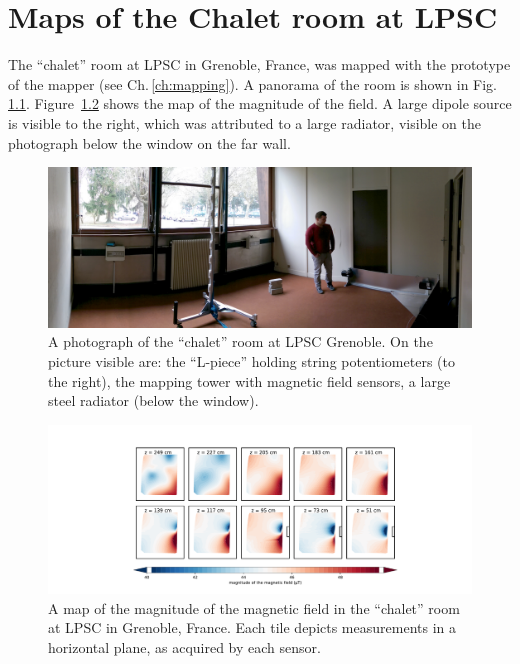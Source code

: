\chapter{Maps of the Chalet room at LPSC}
\label{ch:chalet_appendix}
The ``chalet'' room at LPSC in Grenoble, France, was mapped with the prototype of the mapper (see Ch.\,\ref{ch:mapping}). A panorama of the room is shown in Fig.\,\ref{fig:mapping_lpsc_chalet}. Figure~\ref{fig:mapping_lpsc_chalet_magnitude_map} shows the map of the magnitude of the field. A large dipole source is visible to the right, which was attributed to a large radiator, visible on the photograph below the window on the far wall.

\begin{figure}[h!]
  \centering
  \includegraphics[width=\linewidth]{gfx/mapping/lpsc/chalet_panorama.jpg}
  \caption{A photograph of the ``chalet'' room at LPSC Grenoble. On the picture visible are: the ``L-piece'' holding string potentiometers (to the right), the mapping tower with magnetic field sensors, a large steel radiator (below the window).}\label{fig:mapping_lpsc_chalet}
\end{figure}

\begin{figure}[h!]
  \centering
  \includegraphics[width=\linewidth]{gfx/mapping/lpsc/chalet.pdf}
  \caption{A map of the magnitude of the magnetic field in the ``chalet'' room at LPSC in Grenoble, France. Each tile depicts measurements in a horizontal plane, as acquired by each sensor.}\label{fig:mapping_lpsc_chalet_magnitude_map}
\end{figure}
